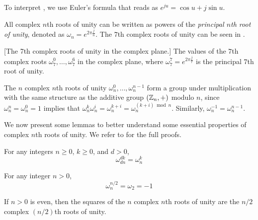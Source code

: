 To interpret , we use Euler's formula that reads as
$e^{j u} = \cos u + j \sin u$.

All complex $n$th roots of unity can be written as powers of the
\emph{principal $n$th root of unity}, denoted as $\omega_n = e^{2 \pi
\frac{j}{n}}$. The $7$th complex roots of unity can be seen in
.

\begin{center}
  
  [The 7th complex roots of unity in the complex plane.]{
    The values of the $7$th complex roots $\omega_7^0, \dotsc, \omega_7^6$ in
    the complex plane, where $\omega_7^7 = e^{2 \pi \frac{j}{7}}$ is the
    principal $7$th root of unity.\label{fig:roots7}
  }
\end{center}

The $n$ complex $n$th roots of unity $\omega_n^0, \dotsc, \omega_n^{n - 1}$
form a group under multiplication with the same structure as the additive
group $(\mathbb{Z}_n, +)$ modulo $n$, since $\omega_n^n = \omega_n^0 = 1$ implies
that $\omega_n^k \omega_n^i = \omega_n^{k + i} = \omega_n^{(k + i)
  \bmod{n}}$. Similarly, $\omega_n^{-1} = \omega_n^{n - 1}$.

We now present some lemmas to better understand some essential properties of
complex $n$th roots of unity. We refer to \cite{Cormen:2009:IAT:1614191} for
the full proofs.

\begin{lemma}
  For any integers $n \geq 0$, $k \geq 0$, and $d > 0$,
  \begin{equation}
    \omega_{d n}^{d k} = \omega_n^k
    \label{eq:complex-cancel}
  \end{equation}
  \label{lemma:complex-cancel}
\end{lemma}

\begin{corollary}
  For any integer $n > 0$,
  \begin{equation}
    \omega_n^{n/2} = \omega_2 = -1
    \label{eq:waeva}
  \end{equation}
  \label{coro:waeva}
\end{corollary}

\begin{lemma}
  If $n > 0$ is even, then the squares of the $n$ complex $n$th roots of unity
  are the $n / 2$ complex $(n / 2)$th roots of unity.
  \label{lemma:halving}
\end{lemma}

